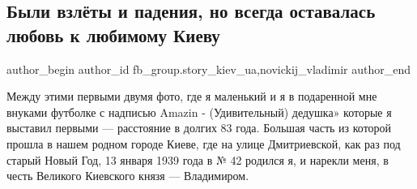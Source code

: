 
 
 
 
 
 
\subsection{Были взлёты и падения, но всегда оставалась любовь к любимому Киеву}
\label{sec:13_01_2022.fb.fb_group.story_kiev_ua.2.vzlety_i_padenia}
 
\ifcmt
 author_begin
   author_id fb_group.story_kiev_ua,novickij_vladimir
 author_end
\fi

Между этими первыми двумя фото, где я маленький и  я в подаренной мне внуками
футболке с надписью  Amazin - (Удивительный) дедушка» которые я выставил первыми
— расстояние в долгих 83 года.  Большая часть из которой прошла в нашем родном
городе Киеве, где на улице Дмитриевской, как раз под старый Новый Год, 13
января 1939 года  в № 42 родился я,  и нарекли меня, в честь Великого Киевского
князя — Владимиром. 


